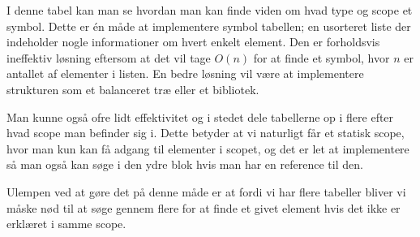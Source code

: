 \noindent I denne tabel kan man se hvordan man kan finde viden om hvad type og scope et symbol. Dette er én måde at implementere symbol tabellen; en usorteret liste der indeholder nogle informationer om hvert enkelt element. Den er forholdsvis ineffektiv løsning eftersom at det vil tage $O(n)$ for at finde et symbol, hvor $n$ er antallet af elementer i listen. En bedre løsning vil være at implementere strukturen som et balanceret træ eller et bibliotek.
    
    Man kunne også ofre lidt effektivitet og i stedet dele tabellerne op i flere efter hvad scope man befinder sig i. Dette betyder at vi naturligt får et statisk scope, hvor man kun kan få adgang til elementer i scopet, og det er let at implementere så man også kan søge i den ydre blok hvis man har en reference til den.
    
    
\noindent Ulempen ved at gøre det på denne måde er at fordi vi har flere tabeller bliver vi måske nød til at søge gennem flere for at finde et givet element hvis det ikke er erklæret i samme scope. 
    
